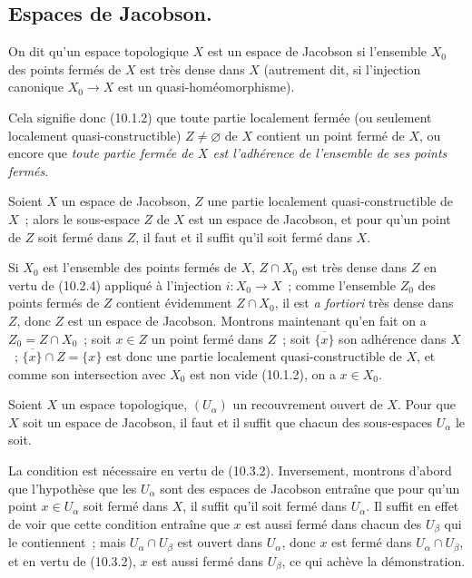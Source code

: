 \subsection{Espaces de Jacobson.}
\label{subsection:IV.10.3-fr}

\begin{definition}[10.3.1]
\label{IV.10.3.1-fr}
On dit qu'un espace topologique $X$ est un espace de Jacobson si
l'ensemble $X_0$ des points fermés de $X$ est très dense dans $X$ \textup{(autrement
dit, si l'injection canonique $X_0\to X$ est un}
quasi-homéomorphisme\textup{)}.
\end{definition}

Cela signifie donc (10.1.2) que toute partie localement fermée (ou seulement
localement quasi-constructible) $Z\neq\varnothing$ de $X$ contient un point
fermé de $X$, ou encore que \emph{toute partie fermée de $X$ est l'adhérence
de l'ensemble de ses points fermés}.

\begin{proposition}[10.3.2]
\label{IV.10.3.2-fr}
Soient $X$ un espace de Jacobson, $Z$ une partie localement
quasi-constructible de $X$~; alors le sous-espace $Z$ de $X$ est un espace de
Jacobson, et pour qu'un point de $Z$ soit fermé dans $Z$, il faut et il suffit
qu'il soit fermé dans $X$.
\end{proposition}

Si $X_0$ est l'ensemble des points fermés de $X$, $Z\cap X_0$ est très dense
dans $Z$ en vertu de (10.2.4) appliqué à l'injection $i:X_0\to X$~; comme
l'ensemble $Z_0$ des points fermés de $Z$ contient évidemment $Z\cap X_0$,
il est \emph{a fortiori} très dense dans $Z$, donc $Z$ est un espace de
Jacobson. Montrons maintenant qu'en fait on a $Z_0=Z\cap X_0$~; soit $x\in Z$
un point fermé dans $Z$~; soit $\overline{\{x\}}$ son adhérence dans $X$~;
$\overline{\{x\}}\cap Z=\{x\}$ est donc une partie localement
quasi-constructible de $X$, et comme son intersection avec $X_0$ est non vide
(10.1.2), on a $x\in X_0$.

\begin{proposition}[10.3.3]
\label{IV.10.3.3-fr}
Soient $X$ un espace topologique, $(U_\alpha)$ un recouvrement ouvert de $X$.
Pour que $X$ soit un espace de Jacobson, il faut et il suffit que chacun des
sous-espaces $U_\alpha$ le soit.
\end{proposition}

La condition est nécessaire en vertu de (10.3.2). Inversement, montrons
d'abord que l'hypothèse que les $U_\alpha$ sont des espaces de Jacobson
entraîne que pour qu'un point $x\in U_\alpha$ soit fermé dans $X$, il suffit
qu'il soit fermé dans $U_\alpha$. Il suffit en effet de voir que cette
condition entraîne que $x$ est aussi fermé dans chacun des $U_\beta$ qui le
contiennent~; mais $U_\alpha\cap U_\beta$ est ouvert dans $U_\alpha$, donc $x$
est fermé dans $U_\alpha\cap U_\beta$, et en vertu de (10.3.2), $x$ est aussi
fermé dans $U_\beta$, ce qui achève la démonstration.

